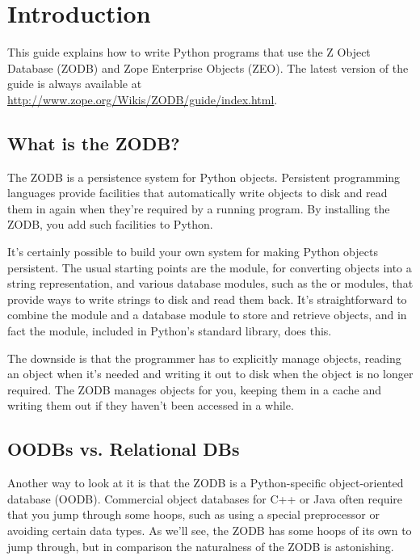 

\section{Introduction}

This guide explains how to write Python programs that use the Z Object
Database (ZODB) and Zope Enterprise Objects (ZEO).  The latest version
of the guide is always available at
\url{http://www.zope.org/Wikis/ZODB/guide/index.html}.

\subsection{What is the ZODB?}

The ZODB is a persistence system for Python objects.  Persistent
programming languages provide facilities that automatically write
objects to disk and read them in again when they're required by a
running program.  By installing the ZODB, you add such facilities to
Python.

It's certainly possible to build your own system for making Python
objects persistent.  The usual starting points are the 
module, for converting objects into a string representation, and
various database modules, such as the  or 
modules, that provide ways to write strings to disk and read them
back.  It's straightforward to combine the  module and
a database module to store and retrieve objects, and in fact the
 module, included in Python's standard library, does
this.

The downside is that the programmer has to explicitly manage objects,
reading an object when it's needed and writing it out to disk when the
object is no longer required.  The ZODB manages objects for you,
keeping them in a cache and writing them out if they haven't been 
accessed in a while.  


\subsection{OODBs vs. Relational DBs}

Another way to look at it is that the ZODB is a Python-specific
object-oriented database (OODB).  Commercial object databases for C++
or Java often require that you jump through some hoops, such as using
a special preprocessor or avoiding certain data types.  As we'll see,
the ZODB has some hoops of its own to jump through, but in comparison
the naturalness of the ZODB is astonishing.

